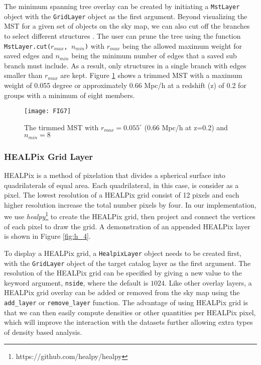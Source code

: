 \documentclass[../vis.tex]{subfiles}
\begin{document}
The minimum spanning tree overlay can be created by initiating a \texttt{MstLayer} object with the \texttt{GridLayer} object as the first argument.
Beyond visualizing the MST for a given set of objects on the sky map, we can also cut off the branches to select different structures \citep[e.g.,][]{Barrow1985,mst2}.
The user can prune the tree using the function \texttt{MstLayer.cut($r_{max}$, $n_{min}$)} with $r_{max}$ being the allowed maximum weight for saved edges and $n_{min}$ being the minimum number of edges that a saved sub branch must include.
As a result, only structures in a single branch with edges smaller than $r_{max}$ are kept.
Figure \ref{fig:mst_trimmed} shows a trimmed MST with a maximum weight of 0.055 degree or approximately 0.66 Mpc/h at a redshift (z) of 0.2 for groups with a minimum of eight members.

\begin{figure}[h]
  \centering
  \texttt{[image: FIG7]}
  \caption{The tirmmed MST with $r_{max}=0.055^\circ$ (0.66 Mpc/h at z=0.2) and $n_{min}=8$}
  \label{fig:mst_trimmed}
\end{figure}

\subsubsection{HEALPix Grid Layer}
HEALPix is a method of pixelation that divides a spherical surface into quadrilaterals of equal area.
Each quadrilateral, in this case, is consider as a pixel. The lowest resolution of a HEALPix grid consist of 12 pixels and each higher resolution increase the total number pixels by four.
In our implementation, we use \textit{healpy}\footnote{https://github.com/healpy/healpy} to create the HEALPix grid, then project and connect the vertices of each pixel to draw the grid.
A demonstration of an appended HEALPix layer is shown in Figure \ref{fig:h_4}.

To display a HEALPix grid, a \texttt{HealpixLayer} object needs to be created first, with the \texttt{GridLayer} object of the target catalog layer as the first argument.
The resolution of the HEALPix grid can be specified by giving a new value to the keyword argument, \texttt{nside}, where the default is $1024$.
Like other overlay layers, a HEALPix grid overlay can be added or removed from the sky map using the \texttt{add\_layer} or \texttt{remove\_layer} function.
The advantage of using HEALPix grid is that we can then easily compute densities or other quantities per HEALPix pixel, which will improve the interaction with the datasets further allowing extra types of density based analysis.
\end{document}
